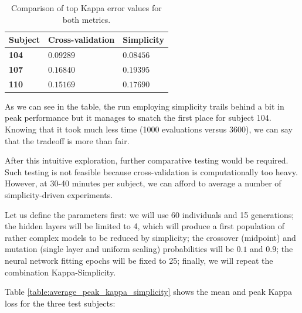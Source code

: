 	\begin{table}[h]

        \centering
        \setlength\arrayrulewidth{0.8pt}

        \begin{tabular}{| >{\centering\arraybackslash}m{0.5in} | >{\centering\arraybackslash}m{1.2in} | >{\centering\arraybackslash}m{1.2in} |}

            \hline
            \rowcolor{RoyalBlue}
            \textbf{Subject} & \textbf{Cross-validation} & \textbf{Simplicity} \\
            \hline
            \textbf{104} & $0.09289$ & $0.08456$ \\
            \hline
            \textbf{107} & $0.16840$ & $0.19395$ \\
            \hline
            \textbf{110} & $0.15169$ & $0.17690$ \\
            \hline

        \end{tabular}

        \caption[Best Kappa values using cross-validation and simplicity]{Comparison of top Kappa error values for both metrics.}\label{table:best_cv_vs_simplicity}

    \end{table}

    As we can see in the table, the run employing simplicity trails behind a bit in peak performance but it manages to snatch the first place for subject 104. Knowing that it took much less time (1000 evaluations versus 3600), we can say that the tradeoff is more than fair.

    After this intuitive exploration, further comparative testing would be required. Such testing is not feasible because cross-validation is computationally too heavy. However, at 30-40 minutes per subject, we can afford to average a number of simplicity-driven experiments. 

    Let us define the parameters first: we will use 60 individuals and 15 generations; the hidden layers will be limited to 4, which will produce a first population of rather complex models to be reduced by simplicity; the crossover (midpoint) and mutation (single layer and uniform scaling) probabilities will be $0.1$ and $0.9$; the neural network fitting epochs will be fixed to 25; finally, we will repeat the combination Kappa-Simplicity.

\newpage

    Table \ref{table:average_peak_kappa_simplicity} shows the mean and peak Kappa loss for the three test subjects:

